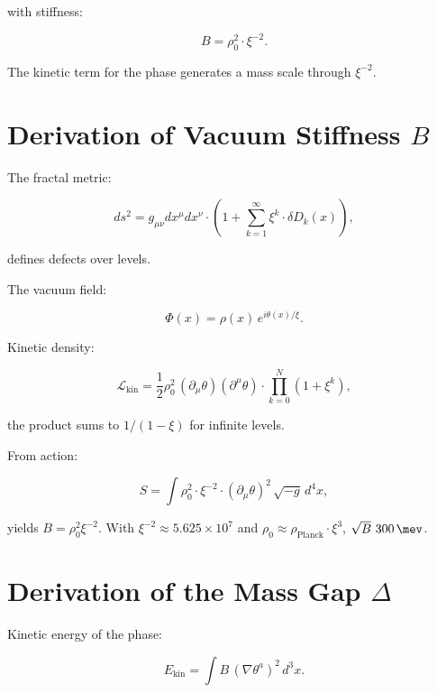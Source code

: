 	with stiffness:
	
	\begin{equation}
		B = \rho_0^2 \cdot \xi^{-2}.
	\end{equation}
	
	The kinetic term for the phase generates a mass scale through $\xi^{-2}$.
	
	\section*{Derivation of Vacuum Stiffness $B$}
	
	The fractal metric:
	
	\begin{equation}
		ds^2 = g_{\mu\nu} dx^\mu dx^\nu \cdot \left(1 + \sum_{k=1}^\infty \xi^k \cdot \delta D_k(x)\right),
	\end{equation}
	
	defines defects over levels.
	
	The vacuum field:
	
	\begin{equation}
		\Phi(x) = \rho(x) \, e^{i \theta(x)/\xi}.
	\end{equation}
	
	Kinetic density:
	
	\begin{equation}
		\mathcal{L}_{\text{kin}} = \frac{1}{2} \rho_0^2 \, (\partial_\mu \theta) (\partial^\mu \theta) \cdot \prod_{k=0}^N (1 + \xi^k),
	\end{equation}
	
	the product sums to $1/(1-\xi)$ for infinite levels.
	
	From action:
	
	\begin{equation}
		S = \int \rho_0^2 \cdot \xi^{-2} \cdot (\partial_\mu \theta)^2 \, \sqrt{-g} \, d^4x,
	\end{equation}
	
	yields $B = \rho_0^2 \xi^{-2}$. With $\xi^{-2} \approx 5.625 \times 10^7$ and $\rho_0 \approx \rho_{\text{Planck}} \cdot \xi^3$, $\sqrt{B} \approx \SI{300}{\mev}$.
	
	\section*{Derivation of the Mass Gap $\Delta$}
	
	Kinetic energy of the phase:
	
	\begin{equation}
		E_{\text{kin}} = \int B \, (\nabla \theta^a)^2 \, d^3x.
	\end{equation}
	
